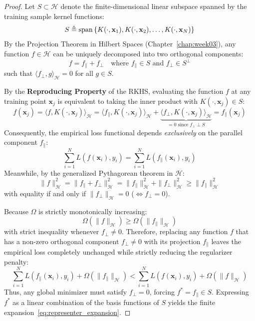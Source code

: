 \begin{proof}
Let $S \subset \mathcal{H}$ denote the finite-dimensional linear subspace spanned by the training sample kernel functions:
\begin{equation}
S \triangleq \operatorname{span}\left\{ K(\cdot, \mathbf{x}_1), K(\cdot, \mathbf{x}_2), \dots, K(\cdot, \mathbf{x}_N) \right\}
\end{equation}
By the Projection Theorem in Hilbert Spaces (Chapter~\ref{chap:week03}), any function $f \in \mathcal{H}$ can be uniquely decomposed into two orthogonal components:
\begin{equation}
f = f_{\|} + f_{\perp} \quad \text{where } f_{\|} \in S \text{ and } f_{\perp} \in S^\perp
\end{equation}
such that $\langle f_{\perp}, g \rangle_{\mathcal{H}} = 0$ for all $g \in S$.

By the \textbf{Reproducing Property} of the RKHS, evaluating the function $f$ at any training point $\mathbf{x}_j$ is equivalent to taking the inner product with $K(\cdot, \mathbf{x}_j) \in S$:
\begin{equation}
f(\mathbf{x}_j) = \langle f, K(\cdot, \mathbf{x}_j) \rangle_{\mathcal{H}} = \langle f_{\|}, K(\cdot, \mathbf{x}_j) \rangle_{\mathcal{H}} + \underbrace{\langle f_{\perp}, K(\cdot, \mathbf{x}_j) \rangle_{\mathcal{H}}}_{= 0 \text{ since } f_{\perp} \perp S} = f_{\|}(\mathbf{x}_j)
\end{equation}
Consequently, the empirical loss functional depends \emph{exclusively} on the parallel component $f_{\|}$:
\begin{equation}
\sum_{i=1}^N L(f(\mathbf{x}_i), y_i) = \sum_{i=1}^N L(f_{\|}(\mathbf{x}_i), y_i)
\end{equation}
Meanwhile, by the generalized Pythagorean theorem in $\mathcal{H}$:
\begin{equation}
\|f\|_{\mathcal{H}}^2 = \|f_{\|} + f_{\perp}\|_{\mathcal{H}}^2 = \|f_{\|}\|_{\mathcal{H}}^2 + \|f_{\perp}\|_{\mathcal{H}}^2 \ge \|f_{\|}\|_{\mathcal{H}}^2
\end{equation}
with equality if and only if $\|f_{\perp}\|_{\mathcal{H}} = 0$ ($\iff f_{\perp} = 0$).

Because $\Omega$ is strictly monotonically increasing:
\begin{equation}
\Omega(\|f\|_{\mathcal{H}}) \ge \Omega(\|f_{\|}\|_{\mathcal{H}})
\end{equation}
with strict inequality whenever $f_{\perp} \ne 0$.
Therefore, replacing any function $f$ that has a non-zero orthogonal component $f_{\perp} \ne 0$ with its projection $f_{\|}$ leaves the empirical loss completely unchanged while strictly reducing the regularizer penalty:
\begin{equation}
\sum_{i=1}^N L(f_{\|}(\mathbf{x}_i), y_i) + \Omega(\|f_{\|}\|_{\mathcal{H}}) < \sum_{i=1}^N L(f(\mathbf{x}_i), y_i) + \Omega(\|f\|_{\mathcal{H}})
\end{equation}
Thus, any global minimizer must satisfy $f_{\perp} = 0$, forcing $f^* = f_{\|} \in S$. Expressing $f^*$ as a linear combination of the basis functions of $S$ yields the finite expansion~\eqref{eq:representer_expansion}.
\end{proof}

